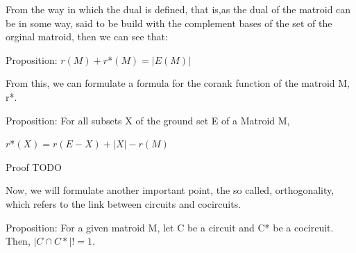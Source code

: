 From the way in which the dual is defined, that is,as the dual of the matroid can be in some way, said to be build with the complement bases of the set of the orginal matroid, then we can see that:


Proposition: 
$r(M) + r$*$(M) = |E(M)|$

From this, we can formulate a formula for the corank function of the matroid M, r*. 


Proposition: For all subsets X of the ground set E of a Matroid M,

$r$*$(X)=r(E-X)+|X|-r(M)$

Proof TODO

Now, we will formulate another important point, the so called, orthogonality, which refers to the link between circuits and cocircuits. 

Proposition: For a given matroid M, let C be a circuit and C* be a cocircuit. Then,  
$|C \cap C*| != 1$.

